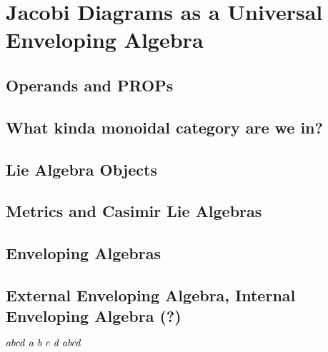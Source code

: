 \chapter{Jacobi Diagrams as a Universal Enveloping Algebra}
\label{ch:jacobi-diagrams-as-a-universal-enveloping-algebra}


\section{Operands and PROPs}

\section{What kinda monoidal category are we in?}

\section{Lie Algebra Objects}

\section{Metrics and Casimir Lie Algebras}

\section{Enveloping Algebras}

\section{External Enveloping Algebra, Internal Enveloping Algebra (?)}


\(a b c d \text{   \textit{a b c d abcd}}\)

